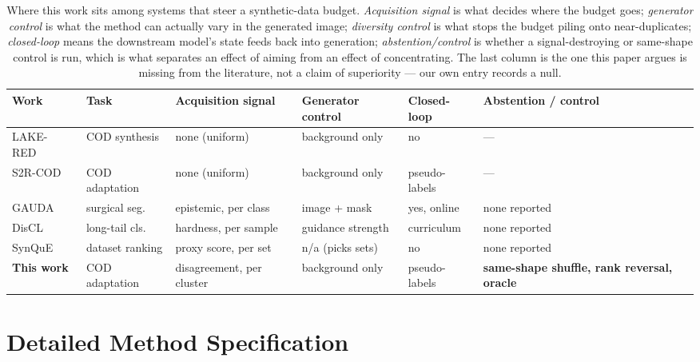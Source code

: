 \documentclass{article}
\begin{document}
\begin{table}[t]
\caption{Where this work sits among systems that steer a synthetic-data budget. \emph{Acquisition
signal} is what decides where the budget goes; \emph{generator control} is what the method can
actually vary in the generated image; \emph{diversity control} is what stops the budget piling onto
near-duplicates; \emph{closed-loop} means the downstream model's state feeds back into generation;
\emph{abstention/control} is whether a signal-destroying or same-shape control is run, which is what separates an effect of aiming from an effect of concentrating. The last column is the one this paper argues is missing from the literature, not a claim of superiority --- our own entry records a
null.}
\label{tab:closest}
\begin{center}
\small
\setlength{\tabcolsep}{3pt}
\footnotesize
\begin{tabular}{@{}lp{1.75cm}p{1.9cm}p{1.75cm}p{1.35cm}p{1.9cm}@{}}
\toprule
Work & Task & Acquisition signal & Generator control & Closed-loop & Abstention / control \\
\midrule
LAKE-RED~\citep{zhao2024lakered} & COD synthesis & none (uniform) & background only & no & --- \\
S2R-COD~\citep{luo2025s2rcod} & COD adaptation & none (uniform) & background only & pseudo-labels & --- \\
GAUDA~\citep{frisch2025gauda} & surgical seg. & epistemic, per class & image + mask & yes, online & none reported \\
DisCL~\citep{liang2025discl} & long-tail cls. & hardness, per sample & guidance strength & curriculum & none reported \\
SynQuE~\citep{chen2025synque} & dataset ranking & proxy score, per set & n/a (picks sets) & no & none reported \\
\midrule
\textbf{This work} & COD adaptation & disagreement, per cluster & background only & pseudo-labels &
\textbf{same-shape shuffle, rank reversal, oracle} \\
\bottomrule
\end{tabular}
\end{center}
\end{table}

\section{Detailed Method Specification}
\label{app:method}
\end{document}
